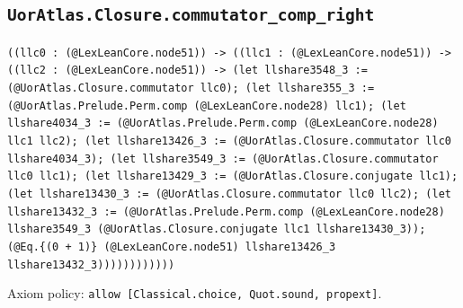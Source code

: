 \documentclass[11pt]{article}
\begin{document}
\subsection*{\texttt{UorAtlas.Closure.commutator\_comp\_right}}
\noindent\texttt{((llc0 : (@LexLeanCore.node51)) -> ((llc1 : (@LexLeanCore.node51)) -> ((llc2 : (@LexLeanCore.node51)) -> (let llshare3548\_3 := (@UorAtlas.Closure.commutator llc0); (let llshare355\_3 := (@UorAtlas.Prelude.Perm.comp (@LexLeanCore.node28) llc1); (let llshare4034\_3 := (@UorAtlas.Prelude.Perm.comp (@LexLeanCore.node28) llc1 llc2); (let llshare13426\_3 := (@UorAtlas.Closure.commutator llc0 llshare4034\_3); (let llshare3549\_3 := (@UorAtlas.Closure.commutator llc0 llc1); (let llshare13429\_3 := (@UorAtlas.Closure.conjugate llc1); (let llshare13430\_3 := (@UorAtlas.Closure.commutator llc0 llc2); (let llshare13432\_3 := (@UorAtlas.Prelude.Perm.comp (@LexLeanCore.node28) llshare3549\_3 (@UorAtlas.Closure.conjugate llc1 llshare13430\_3)); (@Eq.\{(0 + 1)\} (@LexLeanCore.node51) llshare13426\_3 llshare13432\_3))))))))))))}\par
\noindent Axiom policy: \texttt{allow [Classical.choice, Quot.sound, propext]}.\par
\end{document}
